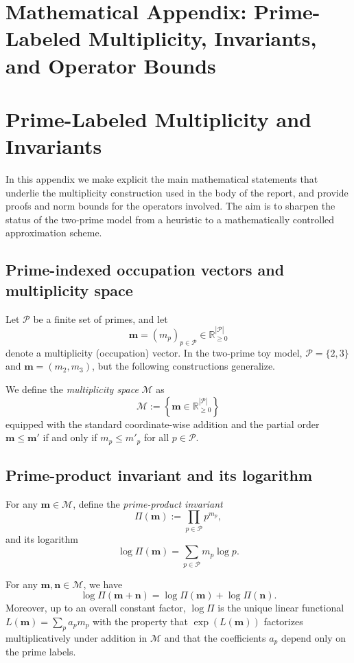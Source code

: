 \documentclass[11pt]{article}
\begin{document}
\appendix
\section*{Mathematical Appendix: Prime-Labeled Multiplicity, Invariants, and Operator Bounds}

\renewcommand{\thesection}{A.\arabic{section}}
\setcounter{section}{0}

\section{Prime-Labeled Multiplicity and Invariants}

In this appendix we make explicit the main mathematical statements that underlie the multiplicity construction used in the body of the report, and provide proofs and norm bounds for the operators involved. The aim is to sharpen the status of the two-prime model from a heuristic to a mathematically controlled approximation scheme.

\subsection{Prime-indexed occupation vectors and multiplicity space}

Let \(\mathcal{P}\) be a finite set of primes, and let
\[
\mathbf{m} = (m_p)_{p\in\mathcal{P}} \in \mathbb{R}_{\ge 0}^{|\mathcal{P}|}
\]
denote a multiplicity (occupation) vector. In the two-prime toy model, \(\mathcal{P} = \{2,3\}\) and \(\mathbf{m} = (m_2,m_3)\), but the following constructions generalize.

We define the \emph{multiplicity space} \(\mathcal{M}\) as
\[
\mathcal{M} := \left\{ \mathbf{m} \in \mathbb{R}_{\ge 0}^{|\mathcal{P}|} \right\}
\]
equipped with the standard coordinate-wise addition and the partial order \(\mathbf{m} \le \mathbf{m}'\) if and only if \(m_p \le m'_p\) for all \(p\in\mathcal{P}\).

\subsection{Prime-product invariant and its logarithm}

For any \(\mathbf{m} \in \mathcal{M}\), define the \emph{prime-product invariant}
\[
\Pi(\mathbf{m}) := \prod_{p\in\mathcal{P}} p^{m_p},
\]
and its logarithm
\[
\log\Pi(\mathbf{m}) = \sum_{p\in\mathcal{P}} m_p \log p.
\]

\begin{lemma}
For any \(\mathbf{m},\mathbf{n}\in\mathcal{M}\), we have
\[
\log\Pi(\mathbf{m} + \mathbf{n}) = \log\Pi(\mathbf{m}) + \log\Pi(\mathbf{n}).
\]
Moreover, up to an overall constant factor, \(\log\Pi\) is the unique linear functional \(L(\mathbf{m}) = \sum_p a_p m_p\) with the property that \(\exp(L(\mathbf{m}))\) factorizes multiplicatively under addition in \(\mathcal{M}\) and that the coefficients \(a_p\) depend only on the prime labels.
\end{lemma}
\end{document}
